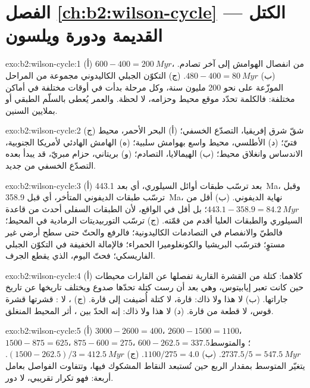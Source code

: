 \section*{الفصل \ref{ch:b2:wilson-cycle} --- الكتل القديمة ودورة ويلسون}

\begin{solution}{exo:b2:wilson-cycle:1}
(أ) $600 - 400 = \qty{200}{Myr}$، من انفصال الهوامش إلى آخر تصادم.
(ب) $480 - 400 = \qty{80}{Myr}$. (ج) التكوّن الجبلي الكاليدوني مجموعة من المراحل الموزّعة على
نحو 200 مليون سنة، وكل مرحلة بدأت في أوقات مختلفة في أماكن مختلفة: فالكلمة
تحدّد موقع محيط وحزامه، لا لحظة. والعمر يُعطى بالسلّم الطبقي أو
بملايين السنين.
\end{solution}

\begin{solution}{exo:b2:wilson-cycle:2}
(ج) شقّ شرق إفريقيا، التصدّع الخسفي؛ (أ) البحر الأحمر، محيط فتيّ؛ (د) الأطلسي، محيط
واسع بهوامش سلبية؛ (ه) الهامش الهادئي لأمريكا الجنوبية، الاندساس
وانغلاق محيط؛ (ب) الهيمالايا، التصادم؛ (و) بريتاني، حزام مبريّ، قد يبدأ بعده
التصدّع الخسفي من جديد.
\end{solution}

\begin{solution}{exo:b2:wilson-cycle:3}
(أ) بعد ترسّب طبقات أوائل السيلوري، أي بعد \qty{443.1}{Ma}، وقبل
ترسّب طبقات الديفوني المتأخر، أي قبل \qty{358.9}{Ma}، نهاية الديفوني.
(ب) أقل من $443.1 - 358.9 = \qty{84.2}{Myr}$؛ بل أقل في الواقع، لأن الطبقات السفلى أحدث
من قاعدة السيلوري والطبقات العليا أقدم من قمّته. (ج) ترسّب
التوربيديتات الرمادية في المحيط؛ فالطيّ والانفصام في التصادمات الكاليدونية؛ فالرفع
والحتّ حتى سطح أرضي غير مستوٍ؛ فترسّب البريشيا والكونغلوميرا الحمراء؛ فالإمالة
الخفيفة في التكوّن الجبلي الفاريسكي؛ فحتّ اليوم، الذي يقطع الجرف.
\end{solution}

\begin{solution}{exo:b2:wilson-cycle:4}
(أ) كلاهما: كتلة من القشرة القارية تفصلها عن القارات محيطات حين كانت
تعبر إيابيتوس، وهي بعد أن رست كتلة تحدّها صدوع ويختلف تاريخها عن تاريخ
جاراتها. (ب) لا هذا ولا ذاك: قارة، لا كتلة أُضيفت إلى قارة. (ج) ، لا
: قشرتها قشرة قوس، لا قطعة من قارة. (د) لا هذا ولا ذاك: إنه
الحدّ بين ، أثر المحيط المنغلق.
\end{solution}

\begin{solution}{exo:b2:wilson-cycle:5}
(أ) $3000 - 2600 = 400$، $2600 - 1500 = 1100$، $1500 - 875 = 625$، $875 - 600 = 275$، $600 -
262.5 = 337.5$؛ والمتوسط $2737.5/5 = \qty{547.5}{Myr}$. (ب) $1100/275 = 4.0$. (ج) $(1500 -
262.5)/3 = \qty{412.5}{Myr}$. يتغيّر المتوسط بمقدار الربع حين تُستبعد النقاط المشكوك فيها،
وتتفاوت الفواصل بعامل أربعة: فهو تكرار تقريبي، لا دور.
\end{solution}

